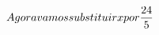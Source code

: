 \documentclass[preview]{standalone}
\begin{document}
\begin{align*}
\special{dvisvgm:raw <g id='unique000'>}Agora vamos substituir x por \frac{24}{5}\special{dvisvgm:raw </g>}
\end{align*}
\end{document}
